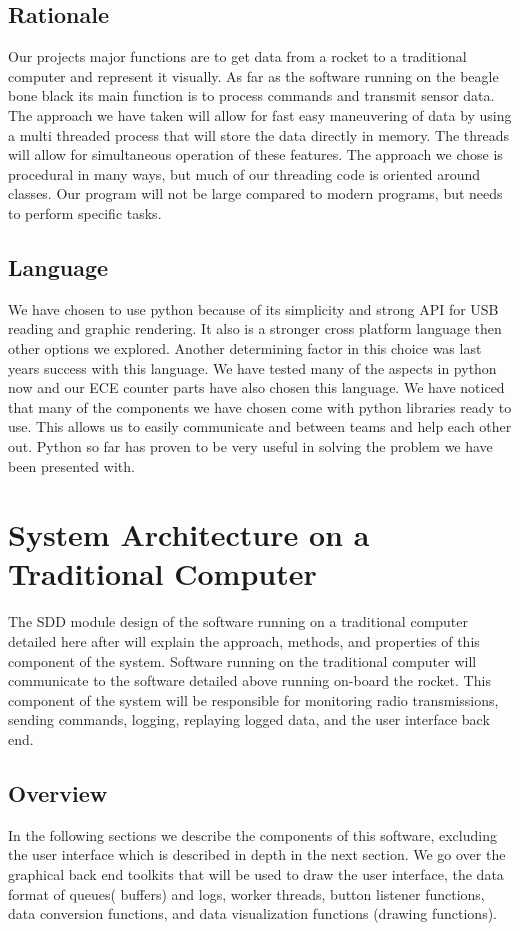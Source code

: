 \documentclass[10pt,draftclsnofoot,onecolumn,compsoc]{IEEEtran}
\begin{document}
\subsection{Rationale}
Our projects major functions are to get data from a rocket to a traditional computer and represent it visually. As far as the software running on the beagle bone black its main function is to process commands and transmit sensor data. The approach we have taken will allow for fast easy maneuvering of data by using a multi threaded process that will store the data directly in memory. The threads will allow for simultaneous operation of these features. The approach we chose is procedural in many ways, but much of our threading code is oriented around classes. Our program will not be large compared to modern programs, but needs to perform specific tasks.

\subsection{Language}
We have chosen to use python because of its simplicity and strong API for USB reading and graphic rendering. It also is a stronger cross platform language then other options we explored. Another determining factor in this choice was last years success with this language. We have tested many of the aspects in python now and our ECE counter parts have also chosen this language. We have noticed that many of the components we have chosen come with python libraries ready to use. This allows us to easily communicate and between teams and help each other out. Python so far has proven to be very useful in solving the problem we have been presented with.

\section{System Architecture on a Traditional Computer }
The SDD module design of the software running on a traditional computer detailed here after will explain the approach, methods, and properties of this component of the system. Software running on the traditional computer will communicate to the software detailed above running on-board the rocket. This component of the system will be responsible for monitoring radio transmissions, sending commands, logging, replaying logged data, and the user interface back end. \par

\subsection{Overview}
In the following sections we describe the components of this software, excluding the user interface which is described in depth in the next section. We go over the graphical back end toolkits that will be used to draw the user interface, the data format of queues( buffers) and logs, worker threads, button listener functions, data conversion functions, and data visualization functions (drawing functions). \par
\end{document}
